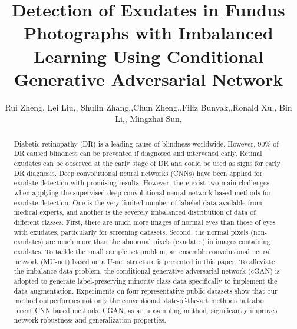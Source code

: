 \documentclass{osa-article}
\begin{document}
\title{Detection of Exudates in Fundus Photographs with Imbalanced Learning Using Conditional Generative Adversarial Network}


\author{Rui Zheng, Lei Liu,, Shulin Zhang,,Chun Zheng,,Filiz Bunyak,,Ronald Xu,, Bin Li,, Mingzhai Sun, }


\address{Department of Precision Machinery and Instrumentation, University of Science and Technology of China, Hefei, 230022, China\\
Department of Electronic Engineering and Information Science, University of Science and Technology of China, Hefei, Anhui, 230022, China\\
The 105 Hospital of PLA, Hefei, 230031, China\\
The 105 Hospital of PLA, Hefei, 230031, China\\
}




\begin{abstract}
Diabetic retinopathy (DR) is a leading cause of blindness worldwide. However, 90\% of DR caused blindness can be prevented if diagnosed and intervened early. Retinal exudates can be observed at the early stage of DR and could be used as signs for early DR diagnosis. Deep convolutional neural networks (CNNs) have been applied for exudate detection with promising results. However, there exist two main challenges when applying the supervised deep convolutional neural network based methods for exudate detection. One is the very limited number of labeled data available from medical experts, and another is the severely imbalanced distribution of data of different classes. First, there are much more images of normal eyes than those of eyes with exudates, particularly for screening datasets. Second, the normal pixels (non-exudates) are much more than the abnormal pixels (exudates) in images containing exudates. To tackle the small sample set problem, an ensemble convolutional neural network (MU-net) based on a U-net structure is presented in this paper. To alleviate the imbalance data problem, the conditional generative adversarial network (cGAN) is adopted to generate label-preserving minority class data specifically to implement the data augmentation.
Experiments on four representative public datasets show that our method outperformes not only the conventional state-of-the-art methods but also recent CNN based methods. CGAN, as an upsampling method, significantly improves network robustness and generalization properties.
\end{abstract}
\end{document}
